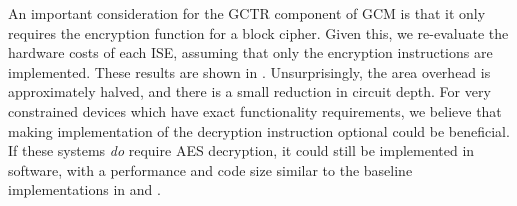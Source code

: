 An important consideration for the GCTR component of GCM is that it only
requires the encryption function for a block cipher.
Given this, we re-evaluate the hardware costs of each ISE, assuming that
only the encryption instructions are implemented.
These results are shown in .
Unsurprisingly, the area overhead is approximately halved, and there is
a small reduction in circuit depth.
For very constrained devices which have exact functionality
requirements, we believe that making implementation of the decryption
instruction optional could be beneficial.
If these systems {\em do} require AES decryption, it could still be
implemented in software, with a performance and code size similar
to the baseline implementations in
and
.

